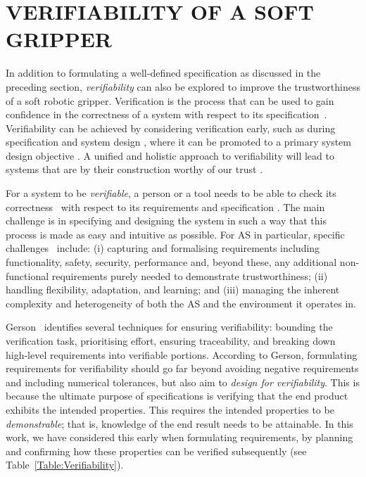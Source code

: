 \documentclass[letterpaper, 10 pt, conference]{ieeeconf}  %
\begin{document}
	\section{VERIFIABILITY OF A SOFT GRIPPER} \label{verifiability}
	In addition to formulating a well-defined specification as discussed in the preceding section, \emph{verifiability} can also be explored to improve the trustworthiness of a soft robotic gripper. 
	Verification is the process that can be used to gain confidence in the correctness of a system with respect to its specification~\cite{Bergeron2000}. 
	Verifiability can be achieved by considering verification early, such as during specification and system design \cite{Mousavi2022}, where it can be promoted to a primary system design objective \cite{Eder2021}.
	A unified and holistic approach to verifiability will lead to systems that are by their construction worthy of our trust \cite{Mousavi2022}. 
	
	For a system to be {\em verifiable\/}, a person or a tool needs to be able to check its correctness~\cite{ISO24765:2017} with respect to its requirements and specification \cite{Abeywickrama2022}. 
	The main challenge is in specifying and designing the system in such a way that this process is made as easy and intuitive as possible.
	For AS in particular, specific challenges~\cite{Abeywickrama2022} include: 
	(i) capturing and formalising requirements including functionality, safety, security, performance and, beyond these, any additional non-functional requirements purely needed to demonstrate trustworthiness; 
	(ii) handling flexibility, adaptation, and learning; and 
	(iii) managing the inherent complexity and heterogeneity of both the AS and the environment it operates in. 
	
	Gerson~\cite{Gerson1993} identifies several techniques for ensuring verifiability: bounding the verification task, prioritising effort, ensuring traceability, and breaking down high-level requirements into verifiable portions. 
	According to Gerson, formulating requirements for verifiability should go far beyond avoiding negative requirements and including numerical tolerances, but also aim to \emph{design for verifiability}. 
	This is because the ultimate purpose of specifications is verifying that the end product exhibits the intended properties. 
	This requires the intended properties to be \emph{demonstrable}; that is, knowledge of the end result needs to be attainable. 
	In this work, we have considered this early when formulating requirements, by planning and confirming how these properties can be verified subsequently (see Table~\ref{Table:Verifiability}). 
	
\end{document}
